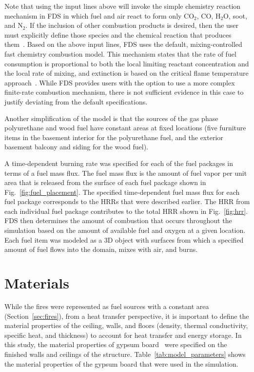 \documentclass[12pt,oneside]{book}
\begin{document}
Note that using the input lines above will invoke the simple chemistry reaction mechanism in FDS in which fuel and air react to form only CO$_2$, CO, H$_2$O, soot, and N$_2$. If the inclusion of other combustion products is desired, then the user must explicitly define those species and the chemical reaction that produces them~\cite{FDS_Users_Guide}. Based on the above input lines, FDS uses the default, mixing-controlled fast chemistry combustion model. This mechanism states that the rate of fuel consumption is proportional to both the local limiting reactant concentration and the local rate of mixing, and extinction is based on the critical flame temperature approach~\cite{FDS_Math_Guide}. While FDS provides users with the option to use a more complex finite-rate combustion mechanism, there is not sufficient evidence in this case to justify deviating from the default specifications.

Another simplification of the model is that the sources of the gas phase polyurethane and wood fuel have constant areas at fixed locations (five furniture items in the basement interior for the polyurethane fuel, and the exterior basement balcony and siding for the wood fuel).

A time-dependent burning rate was specified for each of the fuel packages in terms of a fuel mass flux. The fuel mass flux is the amount of fuel vapor per unit area that is released from the surface of each fuel package shown in Fig.~\ref{fig:fuel_placement}. The specified time-dependent fuel mass flux for each fuel package corresponds to the HRRs that were described earlier. The HRR from each individual fuel package contributes to the total HRR shown in Fig.~\ref{fig:hrr}. FDS then determines the amount of combustion that occurs throughout the simulation based on the amount of available fuel and oxygen at a given location. Each fuel item was modeled as a 3D object with surfaces from which a specified amount of fuel flows into the domain, mixes with air, and burns.

\section{Materials}
\label{sec:materials}

While the fires were represented as fuel sources with a constant area (Section~\ref{sec:fires}), from a heat transfer perspective, it is important to define the material properties of the ceiling, walls, and floors (density, thermal conductivity, specific heat, and thickness) to account for heat transfer and energy storage. In this study, the material properties of gypsum board~\cite{WAKILI2007} were specified on the finished walls and ceilings of the structure. Table~\ref{tab:model_parameters} shows the material properties of the gypsum board that were used in the simulation.
\end{document}
